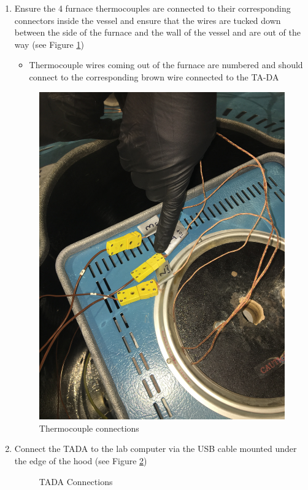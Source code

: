 \documentclass[letterpaper,11pt]{article}
\begin{document}
\begin{enumerate}
    \item Ensure the 4 furnace thermocouples are connected to their 
        corresponding connectors inside the vessel and ensure that the wires are
        tucked down between the side of the furnace and the wall of the vessel 
        and are out of the way (see Figure \ref{fig:Thermocouples})
        \begin {itemize}
        \item Thermocouple wires coming out of the furnace are numbered and
            should connect to the corresponding brown wire connected to 
            the TA-DA
        \end{itemize}
        
\begin{figure}[H]
\centering
\includegraphics[width=.4\textwidth]{Thermocouples.jpg}
\caption{Thermocouple connections}
\label{fig:Thermocouples}
\end{figure}        
        
    \item Connect the TADA to the lab computer via the USB cable mounted 
        under the edge of the hood (see Figure \ref{fig:tada_connect})

        
\begin{figure}[H]
    \centering
    \caption{TADA Connections}
    \label{fig:tada_connect}
\end{figure}
        

\end{enumerate}
\end{document}
